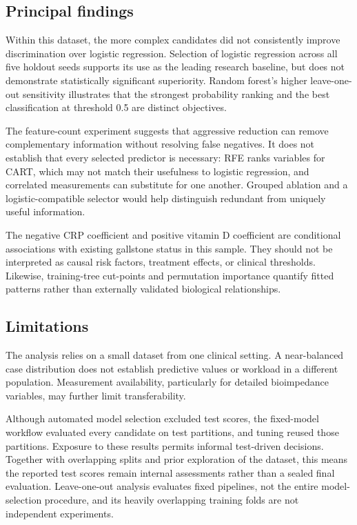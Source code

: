 \subsection{Principal findings}
Within this dataset, the more complex candidates did not consistently improve discrimination over logistic regression. Selection of logistic regression across all five holdout seeds supports its use as the leading research baseline, but does not demonstrate statistically significant superiority. Random forest's higher leave-one-out sensitivity illustrates that the strongest probability ranking and the best classification at threshold 0.5 are distinct objectives.

The feature-count experiment suggests that aggressive reduction can remove complementary information without resolving false negatives. It does not establish that every selected predictor is necessary: RFE ranks variables for CART, which may not match their usefulness to logistic regression, and correlated measurements can substitute for one another. Grouped ablation and a logistic-compatible selector would help distinguish redundant from uniquely useful information.

The negative CRP coefficient and positive vitamin D coefficient are conditional associations with existing gallstone status in this sample. They should not be interpreted as causal risk factors, treatment effects, or clinical thresholds. Likewise, training-tree cut-points and permutation importance quantify fitted patterns rather than externally validated biological relationships.

\subsection{Limitations}
The analysis relies on a small dataset from one clinical setting. A near-balanced case distribution does not establish predictive values or workload in a different population. Measurement availability, particularly for detailed bioimpedance variables, may further limit transferability.

Although automated model selection excluded test scores, the fixed-model workflow evaluated every candidate on test partitions, and tuning reused those partitions. Exposure to these results permits informal test-driven decisions. Together with overlapping splits and prior exploration of the dataset, this means the reported test scores remain internal assessments rather than a sealed final evaluation. Leave-one-out analysis evaluates fixed pipelines, not the entire model-selection procedure, and its heavily overlapping training folds are not independent experiments.

